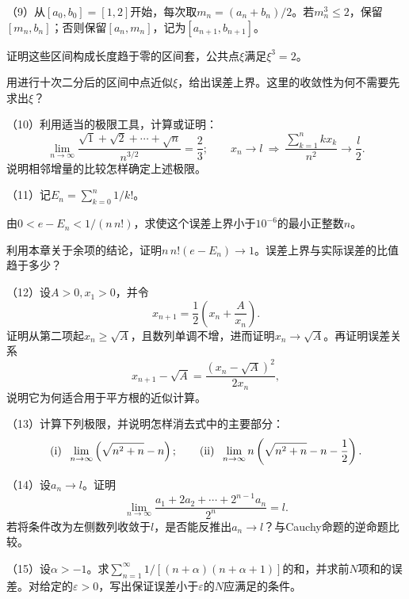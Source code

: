 \begin{exercise}
（9）从\([a_0,b_0]=[1,2]\)开始，每次取\(m_n=(a_n+b_n)/2\)。若\(m_n^3\le2\)，保留\([m_n,b_n]\)；否则保留\([a_n,m_n]\)，记为\([a_{n+1},b_{n+1}]\)。

\quad {}证明这些区间构成长度趋于零的区间套，公共点\(\xi\)满足\(\xi^3=2\)。

\quad {}用进行十次二分后的区间中点近似\(\xi\)，给出误差上界。这里的收敛性为何不需要先求出\(\xi\)？

（10）利用适当的极限工具，计算或证明：
\begin{equation*}
 \lim_{n\to\infty}\frac{\sqrt1+\sqrt2+\cdots+\sqrt n}{n^{3/2}}=\frac23;
 \qquad
 x_n\to l\ \Longrightarrow\
 \frac{\sum_{k=1}^n kx_k}{n^2}\to\frac l2.
\end{equation*}
说明相邻增量的比较怎样确定上述极限。

（11）记\(E_n=\sum_{k=0}^n1/k!\)。

\quad {}由\(0<e-E_n<1/(n\,n!)\)，求使这个误差上界小于\(10^{-6}\)的最小正整数\(n\)。

\quad {}利用本章关于余项的结论，证明\(n\,n!(e-E_n)\to1\)。误差上界与实际误差的比值趋于多少？

（12）设\(A>0,x_1>0\)，并令
\begin{equation*}
 x_{n+1}=\frac12\left(x_n+\frac A{x_n}\right).
\end{equation*}
证明从第二项起\(x_n\ge\sqrt A\)，且数列单调不增，进而证明\(x_n\to\sqrt A\)。再证明误差关系
\begin{equation*}
 x_{n+1}-\sqrt A=\frac{(x_n-\sqrt A)^2}{2x_n},
\end{equation*}
说明它为何适合用于平方根的近似计算。

（13）计算下列极限，并说明怎样消去式中的主要部分：
\begin{equation*}
 \exercisesubitem{1}\ \lim_{n\to\infty}\left(\sqrt{n^2+n}-n\right);
 \qquad
 \exercisesubitem{2}\ \lim_{n\to\infty}n\left(\sqrt{n^2+n}-n-\frac12\right).
\end{equation*}

（14）设\(a_n\to l\)。证明
\begin{equation*}
 \lim_{n\to\infty}\frac{a_1+2a_2+\cdots+2^{n-1}a_n}{2^n}=l.
\end{equation*}
若将条件改为左侧数列收敛于\(l\)，是否能反推出\(a_n\to l\)？与Cauchy命题的逆命题比较。

（15）设\(\alpha>-1\)。求\(\sum_{n=1}^{\infty}1/[(n+\alpha)(n+\alpha+1)]\)的和，并求前\(N\)项和的误差。对给定的\(\varepsilon>0\)，写出保证误差小于\(\varepsilon\)的\(N\)应满足的条件。


\end{exercise}
